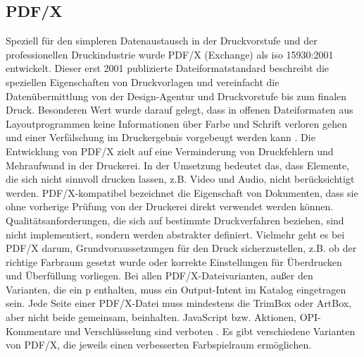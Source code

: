 \subsection{PDF/X}
Speziell für den simpleren Datenaustausch in der Druckvorstufe und der professionellen Druckindustrie wurde PDF/X (Exchange) als \gls{iso} 15930:2001 entwickelt. Dieser erst 2001 publizierte Dateiformatstandard beschreibt die speziellen Eigenschaften von Druckvorlagen und vereinfacht die Datenübermittlung von der Design-Agentur und Druckvorstufe bis zum finalen Druck. Besonderen Wert wurde darauf gelegt, dass in offenen Dateiformaten aus Layoutprogrammen keine Informationen über Farbe und Schrift verloren gehen und einer Verfälschung im Druckergebnis vorgebeugt werden kann \cite{adobe-pdf-e}. Die Entwicklung von PDF/X zielt auf eine Verminderung von Druckfehlern und Mehraufwand in der Druckerei. In der Umsetzung bedeutet das, dass Elemente, die sich nicht sinnvoll drucken lassen, z.B. Video und Audio, nicht berücksichtigt werden. PDF/X-kompatibel bezeichnet die Eigenschaft von Dokumenten, dass sie ohne vorherige Prüfung von der Druckerei direkt verwendet werden können. \\
Qualitätsanforderungen, die sich auf bestimmte Druckverfahren beziehen, sind nicht implementiert, sondern werden abstrakter definiert. Vielmehr geht es bei PDF/X darum, Grundvoraussetzungen für den Druck sicherzustellen, z.B. ob der richtige Farbraum gesetzt wurde oder korrekte Einstellungen für Überdrucken und Überfüllung vorliegen. Bei allen PDF/X-Dateivarianten, außer den Varianten, die ein p enthalten, muss ein Output-Intent im Katalog eingetragen sein. Jede Seite einer PDF/X-Datei muss mindestens die TrimBox oder ArtBox, aber nicht beide gemeinsam, beinhalten. JavaScript bzw. Aktionen, OPI-Kommentare und Verschlüsselung sind verboten \cite{schneeberger}. Es gibt verschiedene Varianten von PDF/X, die jeweils einen verbesserten Farbspielraum ermöglichen. 

